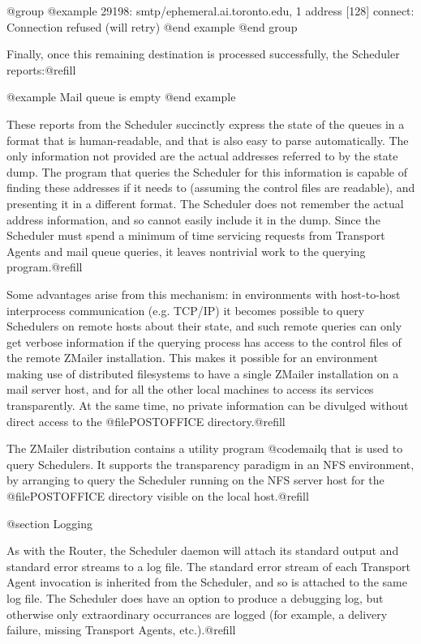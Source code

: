 {{@group
@example
29198:  smtp/ephemeral.ai.toronto.edu, 1 address [128]
                connect: Connection refused (will retry)
@end example
@end group

Finally, once this remaining destination is processed successfully, the
Scheduler reports:@refill

@example
Mail queue is empty
@end example

These reports from the Scheduler succinctly express the state of the
queues in a format that is human-readable, and that is also easy to parse
automatically.  The only information not provided are the actual addresses
referred to by the state dump.  The program that queries the Scheduler for
this information is capable of finding these addresses if it needs
to (assuming the control files are readable), and presenting it in a different
format.  The Scheduler does not remember the actual address information, and
so cannot easily include it in the dump.  Since the Scheduler must spend a
minimum of time servicing requests from Transport Agents and mail queue
queries, it leaves nontrivial work to the querying program.@refill

Some advantages arise from this mechanism: in environments with host-to-host
interprocess communication (e.g. TCP/IP) it becomes possible to query
Schedulers on remote hosts about their state, and such remote queries can
only get verbose information if the querying process has access to the
control files of the remote ZMailer installation.  This makes it possible for
an environment making use of distributed filesystems to have a single ZMailer
installation on a mail server host, and for all the other local machines to
access its services transparently.  At the same time, no private information
can be divulged without direct access to the @file{POSTOFFICE} directory.@refill

The ZMailer distribution contains a utility program @code{mailq} that is used
to query Schedulers.  It supports the transparency paradigm in an
NFS environment, by arranging to query the Scheduler running on the NFS
server host for the @file{POSTOFFICE} directory visible on the local
host.@refill

@section Logging

As with the Router, the Scheduler daemon will attach its standard output and
standard error streams to a log file.  The standard error stream of each
Transport Agent invocation is inherited from the Scheduler, and so is
attached to the same log file.  The Scheduler does have an option to produce
a debugging log, but otherwise only extraordinary occurrances are logged
(for example, a delivery failure, missing Transport Agents, etc.).@refill

}}
